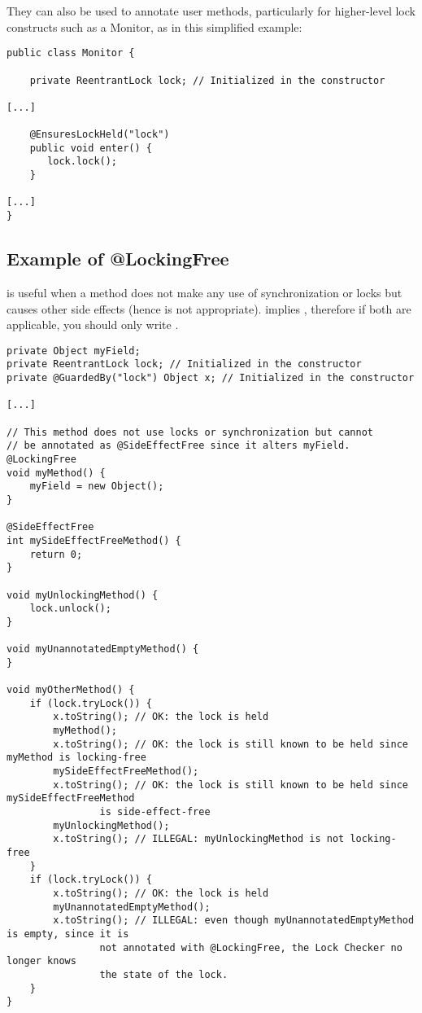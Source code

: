 They can also be used to annotate user methods, particularly for
higher-level lock constructs such as a Monitor, as in this simplified example:

\begin{Verbatim}
public class Monitor {

    private ReentrantLock lock; // Initialized in the constructor

[...]

    @EnsuresLockHeld("lock")
    public void enter() {
       lock.lock();
    }

[...]
}
\end{Verbatim}

\subsection{Example of @LockingFree\label{lock-lockingfree-example}}

 is useful when a method does not make any use of synchronization
or locks but causes other side effects (hence  is not appropriate).
 implies , therefore if both are applicable,
you should only write .


\begin{verbatim}
private Object myField;
private ReentrantLock lock; // Initialized in the constructor
private @GuardedBy("lock") Object x; // Initialized in the constructor

[...]

// This method does not use locks or synchronization but cannot
// be annotated as @SideEffectFree since it alters myField.
@LockingFree
void myMethod() {
    myField = new Object();
}

@SideEffectFree
int mySideEffectFreeMethod() {
    return 0;
}

void myUnlockingMethod() {
    lock.unlock();
}

void myUnannotatedEmptyMethod() {
}

void myOtherMethod() {
    if (lock.tryLock()) {
        x.toString(); // OK: the lock is held
        myMethod();
        x.toString(); // OK: the lock is still known to be held since myMethod is locking-free
        mySideEffectFreeMethod();
        x.toString(); // OK: the lock is still known to be held since mySideEffectFreeMethod
                is side-effect-free
        myUnlockingMethod();
        x.toString(); // ILLEGAL: myUnlockingMethod is not locking-free
    }
    if (lock.tryLock()) {
        x.toString(); // OK: the lock is held
        myUnannotatedEmptyMethod();
        x.toString(); // ILLEGAL: even though myUnannotatedEmptyMethod is empty, since it is
                not annotated with @LockingFree, the Lock Checker no longer knows
                the state of the lock.
    }
}
\end{verbatim}





